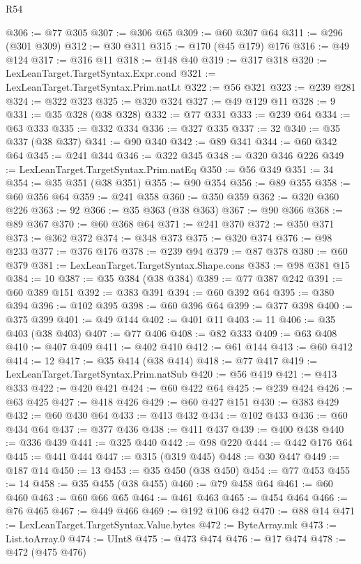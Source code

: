 \begin{lexlean}{R54}
\begin{coremodule}
{{{{{{{{{{{{{{{{{{{{{{{{{{{{{{{{{{{{{{{{{{{{{{{{{{@306 := @77 @305
@307 := @306 @65
@309 := @60 @307 @64
@311 := @296 (@301 @309)
@312 := @30 @311
@315 := @170 (@45 @179) @176
@316 := @49 @124
@317 := @316 @11
@318 := @148 @40
@319 := @317 @318
@320 := LexLeanTarget.TargetSyntax.Expr.cond
@321 := LexLeanTarget.TargetSyntax.Prim.natLt
@322 := @56 @321
@323 := @239 @281
@324 := @322 @323
@325 := @320 @324
@327 := @49 @129 @11
@328 := 9
@331 := @35 @328 (@38 @328)
@332 := @77 @331
@333 := @239 @64
@334 := @63 @333
@335 := @332 @334
@336 := @327 @335
@337 := 32
@340 := @35 @337 (@38 @337)
@341 := @90 @340
@342 := @89 @341
@344 := @60 @342 @64
@345 := @241 @344
@346 := @322 @345
@348 := @320 @346 @226
@349 := LexLeanTarget.TargetSyntax.Prim.natEq
@350 := @56 @349
@351 := 34
@354 := @35 @351 (@38 @351)
@355 := @90 @354
@356 := @89 @355
@358 := @60 @356 @64
@359 := @241 @358
@360 := @350 @359
@362 := @320 @360 @226
@363 := 92
@366 := @35 @363 (@38 @363)
@367 := @90 @366
@368 := @89 @367
@370 := @60 @368 @64
@371 := @241 @370
@372 := @350 @371
@373 := @362 @372
@374 := @348 @373
@375 := @320 @374
@376 := @98 @233
@377 := @376 @176
@378 := @239 @94
@379 := @87 @378
@380 := @60 @379
@381 := LexLeanTarget.TargetSyntax.Shape.cons
@383 := @98 @381 @15
@384 := 10
@387 := @35 @384 (@38 @384)
@389 := @77 @387 @242
@391 := @60 @389 @151
@392 := @383 @391
@394 := @60 @392 @64
@395 := @380 @394
@396 := @102 @395
@398 := @60 @396 @64
@399 := @377 @398
@400 := @375 @399
@401 := @49 @144
@402 := @401 @11
@403 := 11
@406 := @35 @403 (@38 @403)
@407 := @77 @406
@408 := @82 @333
@409 := @63 @408
@410 := @407 @409
@411 := @402 @410
@412 := @61 @144
@413 := @60 @412
@414 := 12
@417 := @35 @414 (@38 @414)
@418 := @77 @417
@419 := LexLeanTarget.TargetSyntax.Prim.natSub
@420 := @56 @419
@421 := @413 @333
@422 := @420 @421
@424 := @60 @422 @64
@425 := @239 @424
@426 := @63 @425
@427 := @418 @426
@429 := @60 @427 @151
@430 := @383 @429
@432 := @60 @430 @64
@433 := @413 @432
@434 := @102 @433
@436 := @60 @434 @64
@437 := @377 @436
@438 := @411 @437
@439 := @400 @438
@440 := @336 @439
@441 := @325 @440
@442 := @98 @220
@444 := @442 @176 @64
@445 := @441 @444
@447 := @315 (@319 @445)
@448 := @30 @447
@449 := @187 @14
@450 := 13
@453 := @35 @450 (@38 @450)
@454 := @77 @453
@455 := 14
@458 := @35 @455 (@38 @455)
@460 := @79 @458 @64
@461 := @60 @460
@463 := @60 @66 @65
@464 := @461 @463
@465 := @454 @464
@466 := @76 @465
@467 := @449 @466
@469 := @192 @106 @42
@470 := @88 @14
@471 := LexLeanTarget.TargetSyntax.Value.bytes
@472 := ByteArray.mk
@473 := List.toArray.{0}
@474 := UInt8
@475 := @473 @474
@476 := @17 @474
@478 := @472 (@475 @476)
}}}}}}}}}}}}}}}}}}}}}}}}}}}}}}}}}}}}}}}}}}}}}}}}}}
\end{coremodule}
\end{lexlean}
